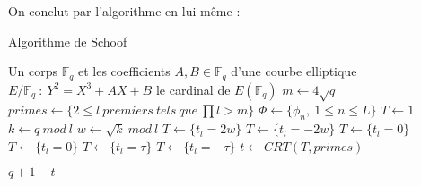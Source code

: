 \documentclass{article}
\theoremstyle{definition}
\theoremstyle{plain}
\begin{document}
On conclut par l'algorithme en lui-même :
\begin{algorithm}
    \caption{Algorithme de Schoof} \label{alg:cap}
    \begin{algorithmic}
        \Require Un corps $\mathbb{F}_q$ et les coefficients $A, B\in \mathbb{F}_q$ d'une courbe elliptique $E/\mathbb{F}_q~:~Y^2=X^3+AX+B$
        \Ensure le cardinal de $E(\mathbb{F}_q)$
        \State $m\gets 4\sqrt{q}$
        \State $primes\gets \{2\leq l~premiers~tels~que~\prod l>m\}$
        \State $\Phi\gets \{\phi_n,~1\leq n\leq L\}$ 
        \State $T\gets 1$
        \State $k\gets q~mod~l$
             
                \State $w\gets \sqrt{k}~mod~l$
                        \State $T\gets \{t_l=2w\}$
                        \Else
                        \State $T\gets \{t_l=-2w\}$
                        \EndIf
                    \Else 
                    \State $T\gets\{t_l=0\}$
                    \EndIf
                \Else 
                \State $T\gets \{t_l=0\}$
                \EndIf
            \Else {}
                    \State $T\gets\{t_l=\tau\}$
                    \Else
                    \State $T\gets\{t_l=-\tau\}$
                    \EndIf
                \EndIf
            \EndFor
            \EndIf 
        \EndFor
        \State $t\gets CRT(T, primes)$ 
    \end{algorithmic}
    \Return $q+1-t$
\end{algorithm}
\end{document}
